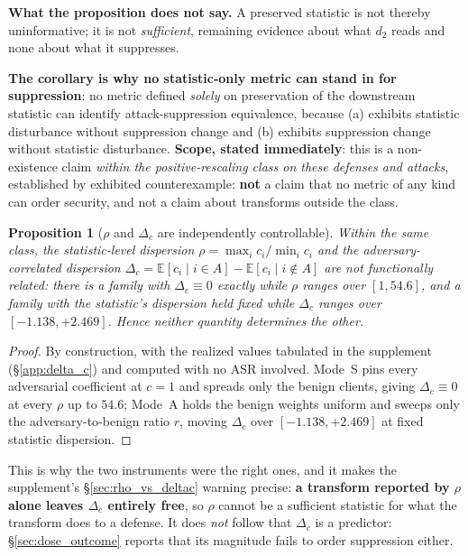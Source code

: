 \documentclass{article}
\newtheorem{proposition}[theorem]{Proposition}
\begin{document}
\noindent \textbf{What the proposition does not say.} A preserved statistic is not thereby uninformative; it is not \emph{sufficient}, remaining evidence about what $d_2$ reads and none about what it suppresses.

\noindent \textbf{The corollary is why no statistic-only metric can stand in for suppression}: no metric defined \emph{solely} on preservation of the downstream statistic can identify attack-suppression equivalence, because (a) exhibits statistic disturbance without suppression change and (b) exhibits suppression change without statistic disturbance. \textbf{Scope, stated immediately}: this is a non-existence claim \emph{within the positive-rescaling class on these defenses and attacks}, established by exhibited counterexample: \textbf{not} a claim that no metric of any kind can order security, and not a claim about transforms outside the class.

\begin{proposition}[$\rho$ and $\Delta_c$ are independently controllable]
\label{prop:rho_deltac}
Within the same class, the statistic-level dispersion $\rho = \max_i c_i/\min_i c_i$ and the adversary-correlated dispersion $\Delta_c = \mathbb{E}[c_i \mid i \in A] - \mathbb{E}[c_i \mid i \notin A]$ are not functionally related: there is a family with $\Delta_c \equiv 0$ exactly while $\rho$ ranges over $[1, 54.6]$, and a family with the statistic's dispersion held fixed while $\Delta_c$ ranges over $[-1.138, +2.469]$. Hence neither quantity determines the other.
\end{proposition}
\begin{proof}
By construction, with the realized values tabulated in the supplement (§\ref{app:delta_c}) and computed with no ASR involved. Mode~S pins every adversarial coefficient at $c{=}1$ and spreads only the benign clients, giving $\Delta_c \equiv 0$ at every $\rho$ up to $54.6$; Mode~A holds the benign weights uniform and sweeps only the adversary-to-benign ratio $r$, moving $\Delta_c$ over $[-1.138,+2.469]$ at fixed statistic dispersion.
\end{proof}

\noindent This is why the two instruments were the right ones, and it makes the supplement's §\ref{sec:rho_vs_deltac} warning precise: \textbf{a transform reported by $\rho$ alone leaves $\Delta_c$ entirely free}, so $\rho$ cannot be a sufficient statistic for what the transform does to a defense. It does \emph{not} follow that $\Delta_c$ is a predictor: §\ref{sec:dose_outcome} reports that its magnitude fails to order suppression either.
\end{document}
